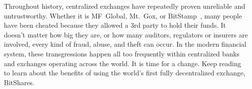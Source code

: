 Throughout history, centralized exchanges have repeatedly proven unreliable and
untrustworthy. Whether it is MF~Global, Mt.~Gox, or
BitStamp~\cite{mfglobal,mtgox,bitstamp}, many people have been cheated because
they allowed a 3rd party to hold their funds. It doesn't matter how big they
are, or how many auditors, regulators or insurers are involved, every kind of
fraud, abuse, and theft can occur. In the modern financial system, these
transgressions happen all too frequently within centralized banks and exchanges
operating across the world. It is time for a change. Keep reading to learn
about the benefits of using the world's first fully decentralized exchange,
BitShares.
